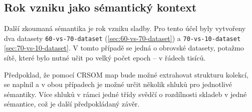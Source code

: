 \documentclass[thesis=M,czech]{FITthesis}[2012/06/26]
\begin{document}


\subsection{Rok vzniku jako sémantický kontext}
Další zkoumaná sémantika je rok vzniku sladby. Pro tento účel byly vytvořeny dva datasety \texttt{60-vs-70-dataset} (\ref{sec:60-vs-70-dataset}) a \texttt{70-vs-10-dataset} \ref{sec:70-vs-10-dataset}. V tomto případě se jedná o obrovské datasety, potažmo sítě, které bylo nutné učit po velký počet epoch -- v řádech tisíců. 

Předpoklad, že pomocí CRSOM map bude možné extrahovat strukturu kolekcí, se naplnil a v obou případech je možné určit několik shluků pro jednotlivé sémantiky. Více shluků v rámci jedné třídy svědčí o rozdílnosti skladeb v jedné sémantice, což je další předpokládaný závěr.
\end{document}
